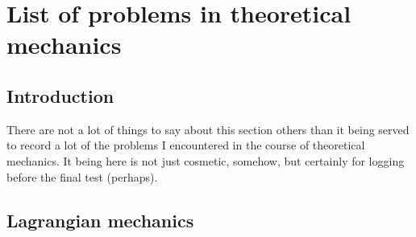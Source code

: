 \chapter{List of problems in theoretical mechanics}

\section{Introduction}
There are not a lot of things to say about this section others than it being served to record a lot of the problems I encountered in the course of theoretical mechanics. It being here is not just cosmetic, somehow, but certainly for logging before the final test (perhaps). 
\section{Lagrangian mechanics}
